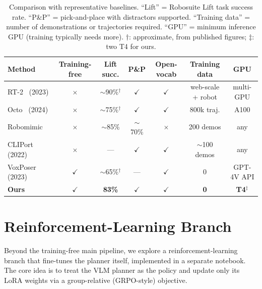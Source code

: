 \documentclass[conference]{IEEEtran}
\begin{document}
\begin{table}[t]
\caption{Comparison with representative baselines. ``Lift'' = Robosuite Lift task success rate. ``P\&P'' = pick-and-place with distractors supported. ``Training data'' = number of demonstrations or trajectories required. ``GPU'' = minimum inference GPU (training typically needs more). $\dagger$: approximate, from published figures; $\ddagger$: two T4 for ours.}
\label{tab:comparison}
\centering\small
\renewcommand{\arraystretch}{1.15}
\begin{tabular}{@{}lcccccc@{}}
\toprule
\textbf{Method} & \textbf{Training-free} & \textbf{Lift succ.} & \textbf{P\&P} & \textbf{Open-vocab} & \textbf{Training data} & \textbf{GPU} \\
\midrule
RT-2~\cite{rt2} (2023)      & $\times$ & $\sim$90\%$^\dagger$ & $\checkmark$ & $\checkmark$ & web-scale + robot & multi-GPU \\
Octo~\cite{octo} (2024)     & $\times$ & $\sim$75\%$^\dagger$ & $\checkmark$ & $\checkmark$ & 800k traj.        & A100 \\
Robomimic~\cite{robomimic}  & $\times$ & $\sim$85\%          & $\sim$70\%   & $\times$     & 200 demos         & any \\
CLIPort~\cite{cliport} (2022) & $\times$ & ---               & $\checkmark$ & $\checkmark$ & $\sim$100 demos    & any \\
VoxPoser~\cite{voxposer} (2023) & $\checkmark$ & $\sim$65\%$^\dagger$ & --- & $\checkmark$ & 0 & GPT-4V API \\
\midrule
\textbf{Ours}               & $\checkmark$ & \textbf{83\%}     & $\checkmark$ & $\checkmark$ & \textbf{0}        & \textbf{T4}$^\ddagger$ \\
\bottomrule
\end{tabular}
\end{table}

\section{Reinforcement-Learning Branch}
\label{sec:rl}

Beyond the training-free main pipeline, we explore a reinforcement-learning branch that fine-tunes the planner itself, implemented in a separate notebook. The core idea is to treat the VLM planner as the policy and update only its LoRA weights via a group-relative (GRPO-style) objective.
\end{document}
